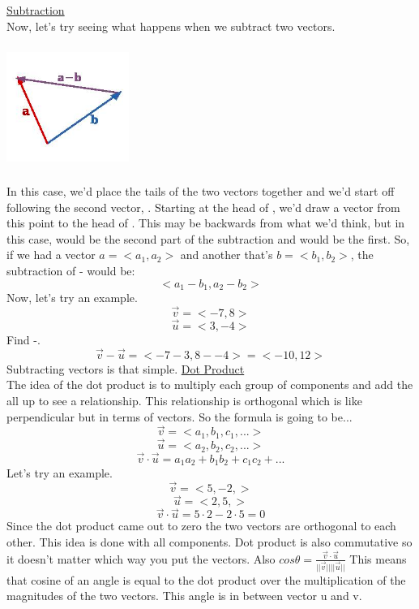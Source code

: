 \documentclass[a4paper,openright, 14pt]{article}
\begin{document}
\underline{Subtraction}\\
Now, let's try seeing what happens when we subtract two vectors.
\begin{center}
    \includegraphics[width=4cm, height=4cm]{Images/subvector.png}
\end{center}
In this case, we'd place the tails of the two vectors together and we'd start off following the second vector, . Starting at the head of , we'd draw a vector from this point to the head of . This may be backwards from what we'd think, but in this case,  would be the second part of the subtraction and  would be the first. So, if we had a vector $a=<a_{1},a_{2}>$ and another that's $b=<b_{1},b_{2}>$, the subtraction of - would be:
$$<a_{1}-b_{1},a_{2}-b_{2}>$$
Now, let's try an example.
$$\overrightarrow{v}=<-7,8>$$
$$\overrightarrow{u}=<3,-4>$$
Find -.
$$\overrightarrow{v}-\overrightarrow{u}=<-7-3,8--4>=<-10,12>$$
Subtracting vectors is that simple.
\underline{Dot Product}\\
The idea of the dot product is to multiply each group of components and add the all up to see a relationship. This relationship is orthogonal which is like perpendicular but in terms of vectors. So the formula is going to be...
$$\overrightarrow{v}=<a_1 ,b_1, c_1,...>$$
$$\overrightarrow{u}=<a_2 ,b_2, c_2,...>$$
$$\overrightarrow{v}\cdot \overrightarrow{u}=a_1 a_2 +b_1 b_2 +c_1 c_2+...$$
Let's try an example.
$$\overrightarrow{v}=<5 ,-2,>$$
$$\overrightarrow{u}=< 2,5,>$$
$$\overrightarrow{v}\cdot \overrightarrow{u}=5\cdot 2 -2\cdot5=0$$
Since the dot product came out to zero the two vectors are orthogonal to each other. This idea is done with all components. Dot product is also commutative so it doesn't matter which way you put the vectors. Also $cos\theta=\frac{\overrightarrow{v}\cdot \overrightarrow{u}}{||\overrightarrow{v}|| || \overrightarrow{u}||}$
This means that cosine of an angle is equal to the dot product over the multiplication of the magnitudes of the two vectors. This angle is in between vector u and v.
\end{document}

